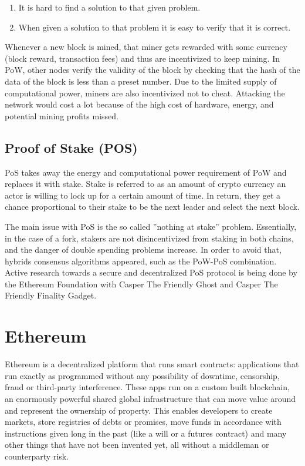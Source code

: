 \begin{enumerate}
\item It is hard to find a solution to that given problem.
\item When given a solution to that problem it is easy to verify that it is correct.
\end{enumerate}

Whenever a new block is mined, that miner gets rewarded with some currency (block reward, transaction fees) and thus are incentivized to keep mining. In PoW, other nodes verify the validity of the block by checking that the hash of the data of the block is less than a preset number. Due to the limited supply of computational power, miners are also incentivized not to cheat. Attacking the network would cost a lot because of the high cost of hardware, energy, and potential mining profits missed.

\subsection{Proof of Stake (POS)}

PoS takes away the energy and computational power requirement of PoW and replaces it with stake. Stake is referred to as an amount of crypto currency an actor is willing to lock up for a certain amount of time. In return, they get a chance proportional to their stake to be the next leader and select the next block.

The main issue with PoS is the so called ”nothing at stake” problem. Essentially, in the case of a fork, stakers are not disincentivized from staking in both chains, and the danger of double spending problems increase. In order to avoid that, hybrids consensus algorithms appeared, such as the PoW-PoS combination. Active research towards a secure and decentralized PoS protocol is being done by the Ethereum Foundation with Casper The Friendly Ghost and Casper The Friendly Finality Gadget.


\section{Ethereum}

Ethereum is a decentralized platform that runs smart contracts: applications that run exactly as programmed without any possibility of downtime, censorship, fraud or third-party interference. These apps run on a custom built blockchain, an enormously powerful shared global infrastructure that can move value around and represent the ownership of property. This enables developers to create markets, store registries of debts or promises, move funds in accordance with instructions given long in the past (like a will or a futures contract) and many other things that have not been invented yet, all without a middleman or counterparty risk.

